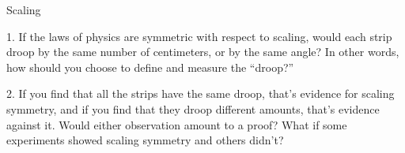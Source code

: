 \begin{lab}{Scaling}


1. If the laws of physics are symmetric with respect to
scaling, would each strip droop by the same number of centimeters,
or by the same angle? In other words, how should you choose to
define and measure the ``droop?''

2. If you find that all the strips have the same droop,
that's evidence for scaling symmetry, and if you find that they droop
different amounts, that's evidence against it. Would either observation
amount to a proof? What if some experiments showed scaling symmetry and
others didn't?


\end{lab}



